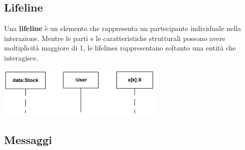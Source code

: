 \documentclass{article}
\begin{document}
\subsection*{Lifeline}
\large

Una \textbf{lifeline} è un elemento che rappresenta un partecipante individuale nella interazione. Mentre le parti e le caratteristiche strutturali possono avere moltiplicità maggiore di 1, le lifelines rappresentano soltanto una entità che interagisce.
\begin{center}
    \includegraphics[width=0.6\textwidth]{foto 4.png}
\end{center}

\subsection*{Messaggi}
\large
\end{document}
